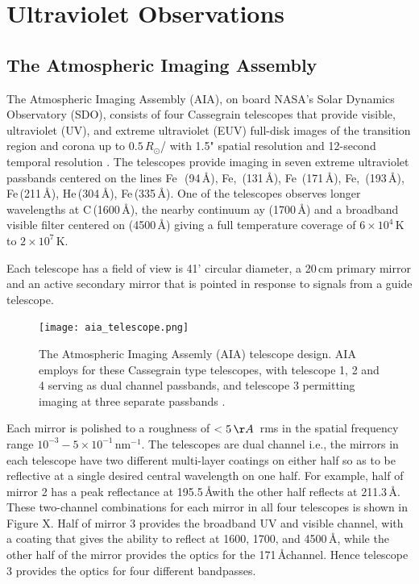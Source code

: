 \section{Ultraviolet Observations}\label{sec:4}

\subsection{The Atmospheric Imaging Assembly}\label{sec:40}

The Atmospheric Imaging Assembly (AIA), on board NASA's Solar Dynamics Observatory (SDO), consists of four Cassegrain telescopes that provide visible, ultraviolet (UV), and extreme ultraviolet (EUV) full-disk images of the transition region and corona up to $0.5\,R_{\odot}$/ with 1.5" spatial resolution and 12-second temporal resolution \citep{lemen2012}. The telescopes provide imaging in seven extreme ultraviolet passbands centered on the lines Fe\, \,(94\,\AA), Fe, \,(131\,\AA), Fe \,(171\,\AA), Fe, \,(193\,\AA), Fe\,(211\,\AA), He\,(304\,\AA), Fe\,(335\,\AA). One of the telescopes observes longer wavelengths at C\,(1600\,\AA), the nearby continuum ay (1700\,\AA) and a broadband visible filter centered on (4500\,\AA)  giving a full temperature coverage of $6\times10^4$\,K to $2\times10^7$\,K.

Each telescope has a field of view is 41' circular diameter, a 20\,cm primary mirror and an active secondary mirror that is pointed in response to signals from a guide telescope. 
\begin{figure}[!t]
\begin{center}
\texttt{[image: aia\_telescope.png]}
\caption[The AIA telescope design]{The Atmospheric Imaging Assemly (AIA) telescope design. AIA employs for these Cassegrain type telescopes, with telescope 1, 2 and 4 serving as dual channel passbands, and telescope 3 permitting imaging at three separate passbands \citep{lemen2012}.}
\end{center}
\end{figure}
Each mirror is polished to a roughness of $<5\,\AA$~rms in the spatial frequency range $10^{-3}-5\times10^{-1}$\,nm$^{-1}$. The telescopes are dual channel i.e., the mirrors in each telescope have two different multi-layer coatings on either half so as to be reflective at a single desired central wavelength on one half. For example, half of mirror 2 has a peak reflectance at 195.5\,\AA with the other half reflects at 211.3\,\AA. These two-channel combinations for each mirror in all four telescopes is shown in Figure X. Half of mirror 3 provides the broadband UV and visible channel, with a coating that gives the ability to reflect at 1600, 1700, and 4500\,\AA, while the other half of the mirror provides the optics for the 171\,\AA channel. Hence telescope 3 provides the optics for four different bandpasses. 

